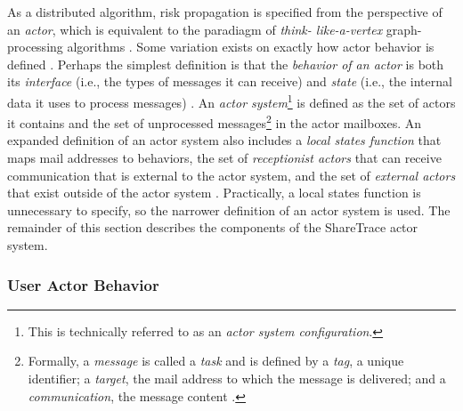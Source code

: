As a distributed algorithm, risk propagation is specified from the perspective of an \emph{actor}, which is equivalent to the paradiagm of \emph{think- like-a-vertex} graph-processing algorithms \cite{McCune2015}. Some variation exists on exactly how actor behavior is defined \cite{Agha1985, Koster2016}. Perhaps the simplest definition is that the \emph{behavior of an actor} is both its \emph{interface} (i.e., the types of messages it can receive) and \emph{state} (i.e., the internal data it uses to process messages) \cite{Koster2016}. An \emph{actor system}\footnote{This is technically referred to as an \emph{actor system configuration}.} is defined as the set of actors it contains and the set of unprocessed messages\footnote{Formally, a \emph{message} is called a \emph{task} and is defined by a \emph{tag}, a unique identifier; a \emph{target}, the mail address to which the message is delivered; and a \emph{communication}, the message content \cite{Agha1985}.} in the actor mailboxes. An expanded definition of an actor system also includes a \emph{local states function} that maps mail addresses to behaviors, the set of \emph{receptionist actors} that can receive communication that is external to the actor system, and the set of \emph{external actors} that exist outside of the actor system \cite{Agha1985}. Practically, a local states function is unnecessary to specify, so the narrower definition of an actor system is used. The remainder of this section describes the components of the ShareTrace actor system.

\subsubsection{User Actor Behavior}\label{sec:behavior}

